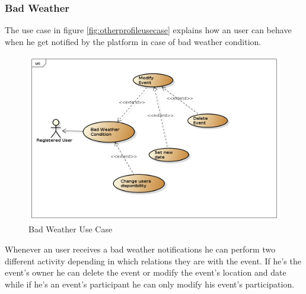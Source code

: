 \subsubsection{Bad Weather}
The use case in figure \ref{fig:otherprofileusecase} explains how an user can behave when he get notified by the platform in case of bad weather condition.
 \begin{center}
 \begin{figure}[H]
    \includegraphics[width=1.1\textwidth]{../UMLDiagram/use_case/BadWeather/BadWeather.png}
    \caption{Bad Weather Use Case}
     \label{fig:badweatherusecase}
     \end{figure}
   \end{center}  
Whenever an user receives a bad weather notifications he can perform two different activity depending in which relations they are with the event. If he's the event's owner he can delete the event or modify the event's location and date while if he's an event's participant he can only modify his event's participation.
